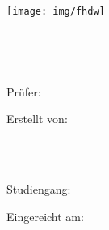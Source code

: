 
\begin{titlepage}

\begin{center}


\texttt{[image: img/fhdw]}\\

\vspace{.7cm}

\Huge{\bfseries\dokumententyp}

~\vspace{.5cm}\\

\LARGE{\dokumententitel}

~\vspace{1.2cm}\\


\large{

Prüfer:\vspace{1mm}\\

\dokumentenpruefer

\vspace{1cm}

Erstellt von:\\\vspace{1mm}

\dokumentenautor\\

\dokumentenautoradress\\

\vspace{1cm}

Studiengang:\vspace{1mm}\\

\studiengang

\vspace{1cm}

Eingereicht am:\vspace{1mm}\\

\abgabedatum

}

\end{center}


\end{titlepage}

